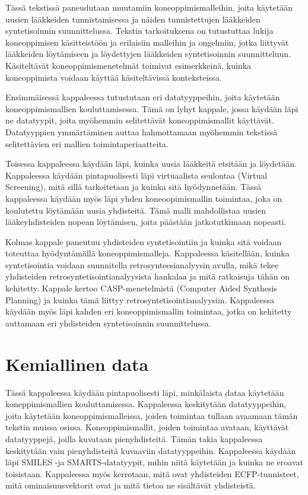 \documentclass[finnish,twoside,censored,tkt,sw-line]{HYthesisML}
\begin{document}
Tässä tekstissä paneudutaan muutamiin koneoppimismalleihin, joita käytetään uusien lääkkeiden tunnistamisessa ja näiden tunnistettujen lääkkeiden syntetisoinnin suunnittelussa.
Tekstin tarkoituksena on tutustuttaa lukija koneoppimisen käsitteistöön ja erilaisiin malleihin ja ongelmiin, jotka liittyvät lääkkeiden löytämiseen ja löydettyjen lääkkeiden syntetisoinnin suunnitteluun.
Käsiteltävät koneoppimismenetelmät toimivat esimerkkeinä, kuinka koneoppimista voidaan käyttää käsiteltävissä konteksteissa.

Ensimmäisessä kappaleessa tutustutaan eri datatyyppeihin, joita käytetään koneoppimismallien kouluttamisessa.
Tämä on lyhyt kappale, jossa käydään läpi ne datatyypit, joita myöhemmin selitettävät koneoppimismallit käyttävät.
Datatyyppien ymmärtäminen auttaa hahmottamaan myöhemmin tekstissä selitettävien eri mallien toimintaperiaatteita.

Toisessa kappaleessa käydään läpi, kuinka uusia lääkkeitä etsitään ja löydetään.
Kappaleessa käydään pintapuolisesti läpi virtuaalista seulontaa (Virtual Screening), mitä sillä tarkoitetaan ja kuinka sitä hyödynnetään.
Tässä kappaleessa käydään myös läpi yhden koneoopimismallin toimintaa, joka on koulutettu löytämään uusia yhdisteitä.
Tämä malli mahdollistaa uusien lääkeyhdisteiden nopean löytämisen, joita päästään jatkotutkimaan nopeasti.

Kolmas kappale paneutuu yhdisteiden syntetisointiin ja kuinka sitä voidaan toteuttaa hyödyntämällä koneoppimismalleja.
Kappaleessa käsitellään, kuinka syntetisointia voidaan suunnitella retrosynteesianalyysin avulla, mikä tekee yhdisteiden retrosyntetisointianalyysista hankalaa ja mitä ratkaisuja tähän on kehitetty.
Kappale kertoo CASP-menetelmistä (Computer Aided Synthesis Planning) ja kuinka tämä liittyy retrosyntetisointianalyysiin.
Kappaleessa käydään myös läpi kahden eri koneoppimismallin toimintaa, jotka on kehitetty auttamaan eri yhdisteiden syntetisoinnin suunnittelussa.

\chapter{Kemiallinen data}

Tässä kappaleessa käydään pintapuolisesti läpi, minkälaista dataa käytetään koneppimismallien kouluttamisessa.
Kappaleessa keskitytään datatyyppeihin, joita käytetään koneoppimismalleissa, joiden toimintaa tullaan avaamaan tämän tekstin muissa osissa.
Koneoppimismallit, joiden toimintaa avataan, käyttävät datatyyppejä, joilla kuvataan pienyhdisteitä.
Tämän takia kappaleessa keskitytään vain pienyhdisteitä kuvaaviin datatyyppeihin.
Kappaleessa käydään läpi SMILES -ja SMARTS-datatyypit, mihin niitä käytetään ja kuinka ne eroavat toisistaan.
Kappaleessa myös kerrotaan, mitä ovat yhdisteiden ECFP-tunnisteet, mitä ominaisuusvektorit ovat ja mitä tietoa ne sisältävät yhdisteistä.
\end{document}
